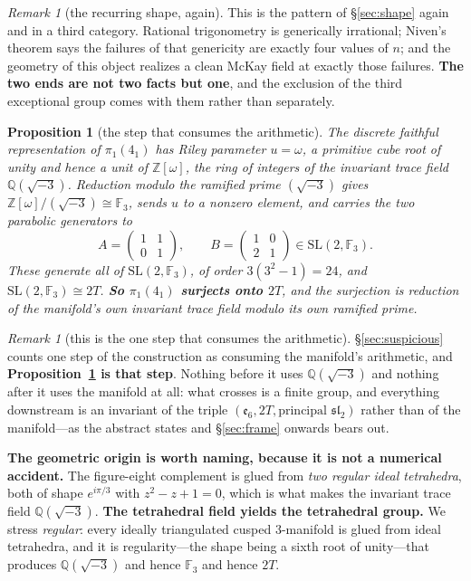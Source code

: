 \documentclass[11pt,reqno]{amsart}
\theoremstyle{plain}
\newtheorem{proposition}[theorem]{Proposition}
\theoremstyle{definition}
\theoremstyle{remark}
\newtheorem{remark}[theorem]{Remark}
\newcommand{\Q}{\mathbb{Q}}
\newcommand{\Z}{\mathbb{Z}}
\newcommand{\F}{\mathbb{F}}
\newcommand{\SL}{\mathrm{SL}}
\newcommand{\sll}{\mathfrak{sl}}
\newcommand{\ee}{\mathfrak{e}}
\begin{document}
\begin{remark}[the recurring shape, again]\label{rem:nivenshape}
This is the pattern of \S\ref{sec:shape} again and in a third category. Rational
trigonometry is generically irrational; Niven's theorem says the failures of that
genericity are exactly four values of $n$; and the geometry of this object realizes a
clean McKay field at exactly those failures. \textbf{The two ends are not two facts but
one}, and the exclusion of the third exceptional group comes with them rather than
separately.
\end{remark}

\begin{proposition}[the step that consumes the arithmetic]\label{prop:mod3}
The discrete faithful representation of $\pi_1(4_1)$ has Riley parameter $u=\omega$, a
primitive cube root of unity and hence a \emph{unit} of $\Z[\omega]$, the ring of
integers of the invariant trace field $\Q(\sqrt{-3})$. Reduction modulo the ramified prime
$(\sqrt{-3})$ gives $\Z[\omega]/(\sqrt{-3})\cong\F_3$, sends $u$ to a nonzero element,
and carries the two parabolic generators to
\[
   A=\begin{pmatrix}1&1\\0&1\end{pmatrix},\qquad
   B=\begin{pmatrix}1&0\\2&1\end{pmatrix}\in\SL(2,\F_3).
\]
These generate all of $\SL(2,\F_3)$, of order $3(3^2-1)=24$, and
$\SL(2,\F_3)\cong2T$. \textbf{So $\pi_1(4_1)$ surjects onto $2T$}, and the surjection is
reduction of the manifold's own invariant trace field modulo its own ramified prime.
\end{proposition}

\begin{remark}[this is the one step that consumes the arithmetic]\label{rem:consumes}
\S\ref{sec:suspicious} counts one step of the construction as consuming the manifold's
arithmetic, and \textbf{Proposition~\ref{prop:mod3} is that step}. Nothing before it uses
$\Q(\sqrt{-3})$ and nothing after it uses the manifold at all: what crosses is a finite
group, and everything downstream is an invariant of the triple
$(\ee_6,2T,\text{principal }\sll_2)$ rather than of the manifold---as the abstract states
and \S\ref{sec:frame} onwards bears out.

\textbf{The geometric origin is worth naming, because it is not a numerical accident.}
The figure-eight complement is glued from \emph{two regular ideal tetrahedra}, both of
shape $e^{i\pi/3}$ with $z^2-z+1=0$, which is what makes the invariant trace field
$\Q(\sqrt{-3})$. \textbf{The tetrahedral field yields the tetrahedral group.} We stress
\emph{regular}: every ideally triangulated cusped $3$-manifold is glued from ideal
tetrahedra, and it is regularity---the shape being a sixth root of unity---that produces
$\Q(\sqrt{-3})$ and hence $\F_3$ and hence $2T$.
\end{remark}
\end{document}
